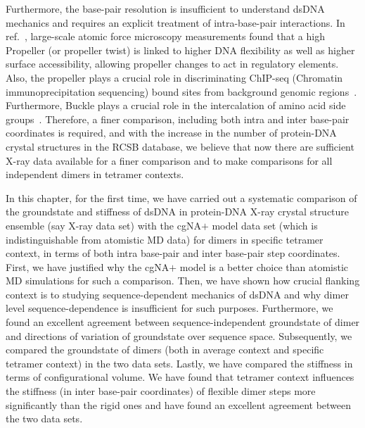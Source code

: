 Furthermore, the base-pair resolution is insufficient to understand dsDNA mechanics and requires an explicit treatment of intra-base-pair interactions. 
In ref.~\cite{pataskar2019deciphering}, large-scale atomic force microscopy measurements found that a high Propeller (or propeller twist) is linked to higher DNA flexibility as well as higher surface accessibility, allowing propeller changes to act in regulatory elements. 
Also, the propeller plays a crucial role in discriminating ChIP-seq (Chromatin immunoprecipitation sequencing) bound sites from background genomic regions~\cite{mathelier2016dna}. 
Furthermore, Buckle plays a crucial role in the intercalation of amino acid side groups~\cite{kim1993co,kim1993crystal}.
Therefore, a finer comparison, including both intra and inter base-pair coordinates is required, and with the increase 
in the number of protein-DNA crystal structures in the RCSB database, we believe that now there are sufficient X-ray data available for a finer comparison and to make comparisons for all independent dimers in tetramer contexts.

In this chapter, for the first time, we have carried out a systematic comparison of the groundstate and stiffness of dsDNA in protein-DNA X-ray crystal structure ensemble (say X-ray data set) with the cgNA$+$ model data set (which is indistinguishable from atomistic MD data)
for dimers in specific tetramer context, in terms of both  intra base-pair and inter base-pair step coordinates.
First, we have justified why the cgNA$+$ model is a better choice than atomistic MD simulations for such a comparison.
Then, we have shown how crucial flanking context is to studying sequence-dependent mechanics of dsDNA and why dimer level sequence-dependence is insufficient for such purposes.
Furthermore, we found an excellent agreement between sequence-independent groundstate of dimer and directions of variation of groundstate over sequence space. Subsequently, 
we compared the groundstate of dimers (both in average context and specific tetramer context) in the two data sets. 
Lastly, we have compared the stiffness in terms of configurational volume.
We have found that tetramer context influences the stiffness (in inter base-pair coordinates) of flexible dimer steps more significantly than the rigid ones and have found an excellent agreement between the two data sets.

